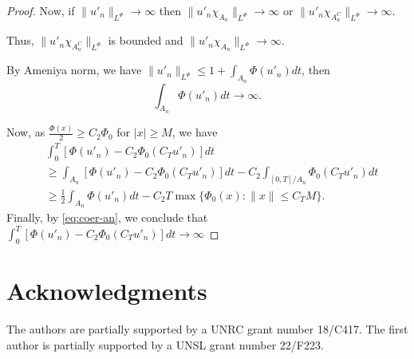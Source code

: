 \documentclass[twoside]{article}
\theoremstyle{remark}
\newcommand{\orlnor}{\|_{L^{\Phi}}}
\renewcommand{\leq}{\leqslant}
\renewcommand{\geq}{\geqslant}
\begin{document}
\begin{proof}
Now, if $\|u'_n\orlnor\to \infty$ then
$\|u'_n\chi_{A_n}\orlnor\to \infty$ or $\|u'_n \chi_{A_n^C}\orlnor\to \infty$.

Thus,
$\|u'_n \chi_{A_n^C}\orlnor$ is bounded and $\|u'_n\chi_{A_n}\orlnor\to \infty$.

By Ameniya norm, we have
$\|u'_n\orlnor \leq 1+\int_{A_n} \Phi(u'_n)dt$, then
\begin{equation}\label{eq:coer-an}
\int_{A_n} \Phi(u'_n)dt\to \infty.
\end{equation}

Now, as $\frac{\Phi(x)}{2}\geq C_2\Phi_0$ for $|x|\geq M$, we have
\begin{equation}
\begin{split}
&\int_0^T [\Phi(u'_n)-C_2 \Phi_0(C_T u'_n)]dt
\\
&\geq
\int_{A_n} [\Phi(u'_n)-C_2 \Phi_0(C_T u'_n)]dt-C_2\int_{[0,T]/A_n} \Phi_0(C_Tu'_n)dt
\\
&\geq \frac{1}{2}\int_{A_n}\Phi(u'_n)dt-C_2T\max\{\Phi_0(x):\|x\|\leq C_TM\}.
\end{split}
\end{equation}
Finally, by \eqref{eq:coer-an}, we conclude that
$\int_0^T [\Phi(u'_n)-C_2 \Phi_0(C_T u'_n)]dt\to \infty$

\end{proof}


\section*{Acknowledgments}
The authors are partially supported by a UNRC grant number 18/C417. The first author is  partially supported by a  UNSL grant number 22/F223. 




% 
 
 

\end{document}
